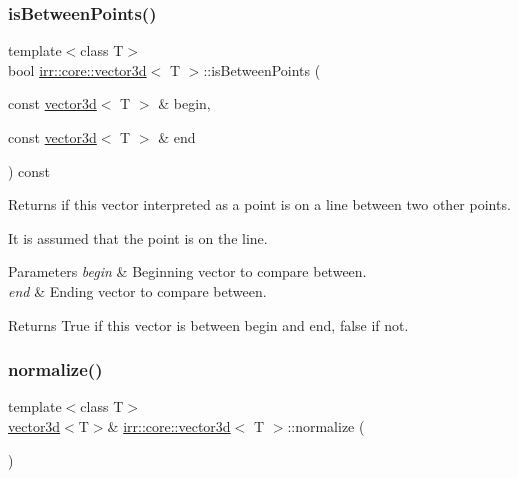 \subsubsection{\texorpdfstring{is\+Between\+Points()}{isBetweenPoints()}\hspace{0.1cm}{\footnotesize\ttfamily [2/2]}}
{\footnotesize\ttfamily template$<$class T$>$ \\
bool \hyperlink{classirr_1_1core_1_1vector3d}{irr\+::core\+::vector3d}$<$ T $>$\+::is\+Between\+Points (\begin{DoxyParamCaption}\item[{const \hyperlink{classirr_1_1core_1_1vector3d}{vector3d}$<$ T $>$ \&}]{begin,  }\item[{const \hyperlink{classirr_1_1core_1_1vector3d}{vector3d}$<$ T $>$ \&}]{end }\end{DoxyParamCaption}) const\hspace{0.3cm}{\ttfamily [inline]}}



Returns if this vector interpreted as a point is on a line between two other points. 

It is assumed that the point is on the line. 
\begin{DoxyParams}{Parameters}
{\em begin} & Beginning vector to compare between. \\
\hline
{\em end} & Ending vector to compare between. \\
\hline
\end{DoxyParams}
\begin{DoxyReturn}{Returns}
True if this vector is between begin and end, false if not. 
\end{DoxyReturn}
\mbox{\label{classirr_1_1core_1_1vector3d_a84a1861464ef70e6965c146732103c09}} 
\subsubsection{\texorpdfstring{normalize()}{normalize()}\hspace{0.1cm}{\footnotesize\ttfamily [1/2]}}
{\footnotesize\ttfamily template$<$class T$>$ \\
\hyperlink{classirr_1_1core_1_1vector3d}{vector3d}$<$T$>$\& \hyperlink{classirr_1_1core_1_1vector3d}{irr\+::core\+::vector3d}$<$ T $>$\+::normalize (\begin{DoxyParamCaption}{ }\end{DoxyParamCaption})\hspace{0.3cm}{\ttfamily [inline]}}



